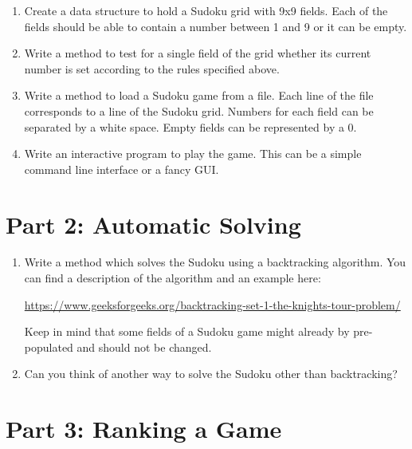 \documentclass{article}
\begin{document}
    \begin{enumerate}
        \item Create a data structure to hold a Sudoku grid with 9x9 fields. Each of the
            fields should be able to contain a number between 1 and 9 or it can be empty.
        \item Write a method to test for a single field of the grid whether its current 
            number is set according to the rules specified above.
        \item Write a method to load a Sudoku game from a file. Each line of the file
            corresponds to a line of the Sudoku grid. Numbers for each field can be
            separated by a white space. Empty fields can be represented by a 0.
        \item Write an interactive program to play the game. This can be a simple command
            line interface or a fancy GUI.
    \end{enumerate}

    \section{Part 2: Automatic Solving}

    \begin{enumerate}
        \item Write a method which solves the Sudoku using a backtracking algorithm. You
            can find a description of the algorithm and an example here: 
            
            \url{https://www.geeksforgeeks.org/backtracking-set-1-the-knights-tour-problem/}

            Keep in mind that some fields of a Sudoku game might already by pre-populated
            and should not be changed.

        \item Can you think of another way to solve the Sudoku other than backtracking?
    \end{enumerate}

    \section{Part 3: Ranking a Game}
\end{document}
